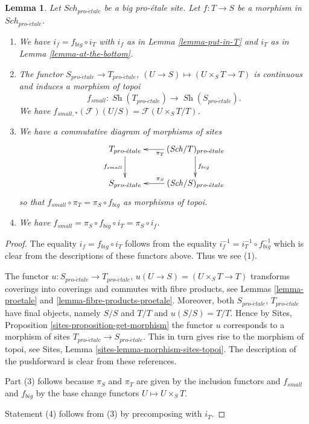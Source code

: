 \documentclass{stacks-project}
\theoremstyle{plain}
\newtheorem{lemma}[subsection]{Lemma}
\theoremstyle{definition}
\theoremstyle{remark}
\numberwithin{equation}{subsection}
\def\Sch{\mathit{Sch}}
\def\Sh{\mathop{\mathit{Sh}}\nolimits}
\def\proetale{{pro\text{-}\acute{e}tale}}
\begin{document}
\begin{lemma}
\label{lemma-morphism-big-small}
Let $\Sch_\proetale$ be a big pro-\'etale site.
Let $f : T \to S$ be a morphism in $\Sch_\proetale$.
\begin{enumerate}
\item We have $i_f = f_{big} \circ i_T$ with $i_f$ as in
Lemma \ref{lemma-put-in-T} and $i_T$ as in
Lemma \ref{lemma-at-the-bottom}.
\item The functor $S_\proetale \to T_\proetale$,
$(U \to S) \mapsto (U \times_S T \to T)$ is continuous and induces
a morphism of topoi
$$
f_{small} : \Sh(T_\proetale) \longrightarrow \Sh(S_\proetale).
$$
We have $f_{small, *}(\mathcal{F})(U/S) = \mathcal{F}(U \times_S T/T)$.
\item We have a commutative diagram of morphisms of sites
$$
\xymatrix{
T_\proetale \ar[d]_{f_{small}} &
(\Sch/T)_\proetale \ar[d]^{f_{big}} \ar[l]^{\pi_T}\\
S_\proetale &
(\Sch/S)_\proetale \ar[l]_{\pi_S}
}
$$
so that $f_{small} \circ \pi_T = \pi_S \circ f_{big}$ as morphisms of topoi.
\item We have $f_{small} = \pi_S \circ f_{big} \circ i_T = \pi_S \circ i_f$.
\end{enumerate}
\end{lemma}

\begin{proof}
The equality $i_f = f_{big} \circ i_T$ follows from the
equality $i_f^{-1} = i_T^{-1} \circ f_{big}^{-1}$ which is
clear from the descriptions of these functors above.
Thus we see (1).

\medskip\noindent
The functor $u : S_\proetale \to T_\proetale$,
$u(U \to S) = (U \times_S T \to T)$
transforms coverings into coverings and commutes with fibre products,
see Lemmas \ref{lemma-proetale} and \ref{lemma-fibre-products-proetale}.
Moreover, both $S_\proetale$, $T_\proetale$ have final objects,
namely $S/S$ and $T/T$ and $u(S/S) = T/T$. Hence by
Sites, Proposition \ref{sites-proposition-get-morphism}
the functor $u$ corresponds to a morphism of sites
$T_\proetale \to S_\proetale$. This in turn gives rise to the
morphism of topoi, see
Sites, Lemma \ref{sites-lemma-morphism-sites-topoi}. The description
of the pushforward is clear from these references.

\medskip\noindent
Part (3) follows because $\pi_S$ and $\pi_T$ are given by the
inclusion functors and $f_{small}$ and $f_{big}$ by the
base change functors $U \mapsto U \times_S T$.

\medskip\noindent
Statement (4) follows from (3) by precomposing with $i_T$.
\end{proof}
\end{document}
